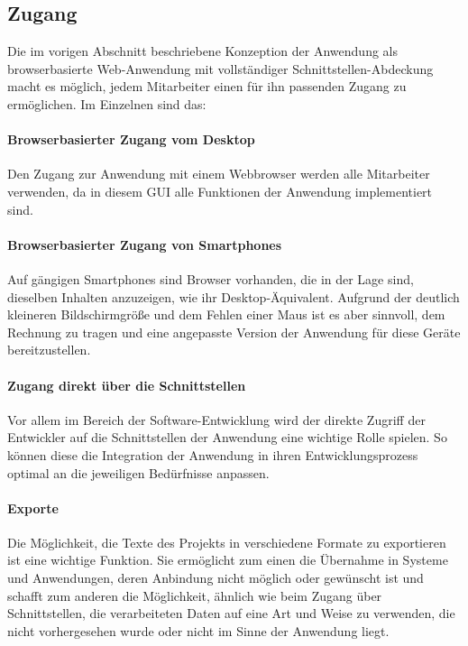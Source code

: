 \subsection{Zugang}

Die im vorigen Abschnitt beschriebene Konzeption der Anwendung als browserbasierte Web-Anwendung mit vollständiger Schnittstellen-Abdeckung macht es möglich, jedem Mitarbeiter einen für ihn passenden Zugang zu ermöglichen. Im Einzelnen sind das:

\paragraph{Browserbasierter Zugang vom Desktop} Den Zugang zur Anwendung mit einem Webbrowser werden alle Mitarbeiter verwenden, da in diesem GUI alle Funktionen der Anwendung implementiert sind.

\paragraph{Browserbasierter Zugang von Smartphones} Auf gängigen Smartphones sind Browser vorhanden, die in der Lage sind, dieselben Inhalten anzuzeigen, wie ihr Desktop-Äquivalent. Aufgrund der deutlich kleineren Bildschirmgröße und dem Fehlen einer Maus ist es aber sinnvoll, dem Rechnung zu tragen und eine angepasste Version der Anwendung für diese Geräte bereitzustellen. 

\paragraph{Zugang direkt über die Schnittstellen} Vor allem im Bereich der Software-Entwicklung wird der direkte Zugriff der Entwickler auf die Schnittstellen der Anwendung eine wichtige Rolle spielen. So können diese die Integration der Anwendung in ihren Entwicklungsprozess optimal an die jeweiligen Bedürfnisse anpassen.

\paragraph{Exporte} Die Möglichkeit, die Texte des Projekts in verschiedene Formate zu exportieren ist eine wichtige Funktion. Sie ermöglicht zum einen die Übernahme in Systeme und Anwendungen, deren Anbindung nicht möglich oder gewünscht ist und schafft zum anderen die Möglichkeit, ähnlich wie beim Zugang über Schnittstellen, die verarbeiteten Daten auf eine Art und Weise zu verwenden, die nicht vorhergesehen wurde oder nicht im Sinne der Anwendung liegt.

